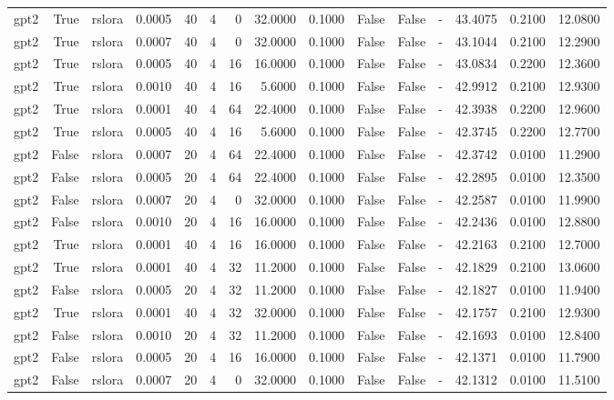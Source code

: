 \begin{tabular}{lrlrrrrrrlllrrr}
gpt2 & True & rslora & 0.0005 & 40 & 4 & 0 & 32.0000 & 0.1000 & False & False & - & 43.4075 & 0.2100 & 12.0800 \\
gpt2 & True & rslora & 0.0007 & 40 & 4 & 0 & 32.0000 & 0.1000 & False & False & - & 43.1044 & 0.2100 & 12.2900 \\
gpt2 & True & rslora & 0.0005 & 40 & 4 & 16 & 16.0000 & 0.1000 & False & False & - & 43.0834 & 0.2200 & 12.3600 \\
gpt2 & True & rslora & 0.0010 & 40 & 4 & 16 & 5.6000 & 0.1000 & False & False & - & 42.9912 & 0.2100 & 12.9300 \\
gpt2 & True & rslora & 0.0001 & 40 & 4 & 64 & 22.4000 & 0.1000 & False & False & - & 42.3938 & 0.2200 & 12.9600 \\
gpt2 & True & rslora & 0.0005 & 40 & 4 & 16 & 5.6000 & 0.1000 & False & False & - & 42.3745 & 0.2200 & 12.7700 \\
gpt2 & False & rslora & 0.0007 & 20 & 4 & 64 & 22.4000 & 0.1000 & False & False & - & 42.3742 & 0.0100 & 11.2900 \\
gpt2 & False & rslora & 0.0005 & 20 & 4 & 64 & 22.4000 & 0.1000 & False & False & - & 42.2895 & 0.0100 & 12.3500 \\
gpt2 & False & rslora & 0.0007 & 20 & 4 & 0 & 32.0000 & 0.1000 & False & False & - & 42.2587 & 0.0100 & 11.9900 \\
gpt2 & False & rslora & 0.0010 & 20 & 4 & 16 & 16.0000 & 0.1000 & False & False & - & 42.2436 & 0.0100 & 12.8800 \\
gpt2 & True & rslora & 0.0001 & 40 & 4 & 16 & 16.0000 & 0.1000 & False & False & - & 42.2163 & 0.2100 & 12.7000 \\
gpt2 & True & rslora & 0.0001 & 40 & 4 & 32 & 11.2000 & 0.1000 & False & False & - & 42.1829 & 0.2100 & 13.0600 \\
gpt2 & False & rslora & 0.0005 & 20 & 4 & 32 & 11.2000 & 0.1000 & False & False & - & 42.1827 & 0.0100 & 11.9400 \\
gpt2 & True & rslora & 0.0001 & 40 & 4 & 32 & 32.0000 & 0.1000 & False & False & - & 42.1757 & 0.2100 & 12.9300 \\
gpt2 & False & rslora & 0.0010 & 20 & 4 & 32 & 11.2000 & 0.1000 & False & False & - & 42.1693 & 0.0100 & 12.8400 \\
gpt2 & False & rslora & 0.0005 & 20 & 4 & 16 & 16.0000 & 0.1000 & False & False & - & 42.1371 & 0.0100 & 11.7900 \\
gpt2 & False & rslora & 0.0007 & 20 & 4 & 0 & 32.0000 & 0.1000 & False & False & - & 42.1312 & 0.0100 & 11.5100 \\

\end{tabular}

